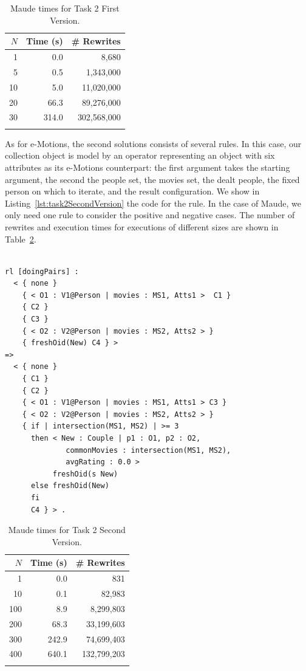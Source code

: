 \begin{table}[htb]
\renewcommand{\tabcolsep}{6pt}
\renewcommand{\arraystretch}{1.2}
    \centering
	\begin{tabular}{r r r}
	$N$ & Time (s) & \# Rewrites \\
	\hline
	1 & 0.0 & 8,680 \\
	5 & 0.5 & 1,343,000 \\
	10 & 5.0 & 11,020,000 \\
	20 & 66.3 & 89,276,000 \\
	30 & 314.0 & 302,568,000 \\
	\hline \\
	\end{tabular}
	\caption{Maude times for Task 2 First Version.}\label{table:maudetask21}
\end{table}

As for e-Motions, the second solutions consists of several rules. In this case, our collection object is model by an operator \code{\{\_\}\{\_\}\{\_\}\{\_\}\{\_\}\{\_\}} representing an object with six attributes as its e-Motions counterpart: the first argument takes the starting argument, the second the people set, the movies set, the dealt people, the fixed person on which to iterate, and the result configuration. We show in Listing~\ref{lst:task2SecondVersion} the code for the  rule. In the case of Maude, we only need one rule to consider the positive and negative cases. The number of rewrites and execution times for executions of different sizes are shown in Table~\ref{table:maudetask22}.

\begin{lstlisting}[caption=\code{doingCouples} Maude rule., label=lst:task2SecondVersion]

rl [doingPairs] :
  < { none }
    { < O1 : V1@Person | movies : MS1, Atts1 >  C1 }
    { C2 }
    { C3 }
    { < O2 : V2@Person | movies : MS2, Atts2 > }
    { freshOid(New) C4 } >
=> 
  < { none }
    { C1 }
    { C2 }
    { < O1 : V1@Person | movies : MS1, Atts1 > C3 }
    { < O2 : V2@Person | movies : MS2, Atts2 > }
    { if | intersection(MS1, MS2) | >= 3 
      then < New : Couple | p1 : O1, p2 : O2, 
              commonMovies : intersection(MS1, MS2), 
              avgRating : 0.0 >
           freshOid(s New)
      else freshOid(New)
      fi 
      C4 } > .
\end{lstlisting}

\begin{table}[htb]
\renewcommand{\tabcolsep}{6pt}
\renewcommand{\arraystretch}{1.2}
    \centering
	\begin{tabular}{r r r}
	$N$ & Time (s) & \# Rewrites \\
	\hline
	1 & 0.0 & 831 \\
	10 & 0.1 & 82,983 \\
	100 & 8.9 & 8,299,803 \\
	200 & 68.3 & 33,199,603 \\
	300 & 242.9 & 74,699,403 \\
	400 & 640.1 & 132,799,203 \\
	\hline \\
	\end{tabular}
	\caption{Maude times for Task 2 Second Version.}\label{table:maudetask22}
\end{table}

